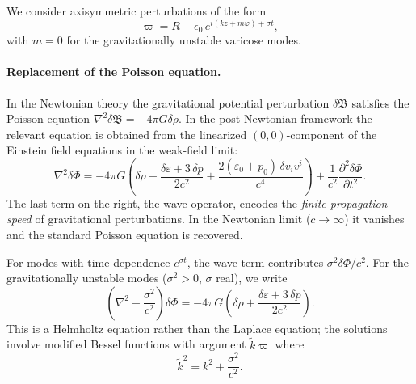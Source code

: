 We consider axisymmetric perturbations of the form
\begin{equation}
\label{eq:rel-12-5}
\varpi = R + \epsilon_{0}\, e^{i(kz + m\varphi) + \sigma t},
\end{equation}
with $m=0$ for the gravitationally unstable varicose modes.

\paragraph{Replacement of the Poisson equation.}
In the Newtonian theory the gravitational potential perturbation
$\delta\mathfrak{B}$ satisfies the Poisson equation
$\nabla^{2}\delta\mathfrak{B} = -4\pi G\delta\rho$.  In the
post-Newtonian framework the relevant equation is obtained from the
linearized $(0,0)$-component of the Einstein field equations in the
weak-field limit:
\begin{equation}
\label{eq:rel-12-6}
\nabla^{2}\delta\Phi = -4\pi G\left(\delta\rho
  + \frac{\delta\varepsilon + 3\,\delta p}{2c^{2}}
  + \frac{2(\varepsilon_{0}+p_{0})\,\delta v_{i} v^{i}}{c^{4}}\right)
  + \frac{1}{c^{2}}\frac{\partial^{2}\delta\Phi}{\partial t^{2}}.
\end{equation}
The last term on the right, the wave operator, encodes the
\emph{finite propagation speed} of gravitational perturbations.  In the
Newtonian limit ($c\to\infty$) it vanishes and the standard Poisson
equation is recovered.

For modes with time-dependence $e^{\sigma t}$, the wave term contributes
$\sigma^{2}\delta\Phi/c^{2}$.  For the gravitationally unstable modes
($\sigma^{2}>0$, $\sigma$ real), we write
\begin{equation}
\label{eq:rel-12-7}
\left(\nabla^{2} - \frac{\sigma^{2}}{c^{2}}\right)\delta\Phi
  = -4\pi G\left(\delta\rho + \frac{\delta\varepsilon + 3\,\delta p}{2c^{2}}\right).
\end{equation}
This is a Helmholtz equation rather than the Laplace equation; the
solutions involve modified Bessel functions with argument
$\tilde{k}\varpi$ where
\begin{equation}
\label{eq:rel-12-8}
\tilde{k}^{2} = k^{2} + \frac{\sigma^{2}}{c^{2}}.
\end{equation}

